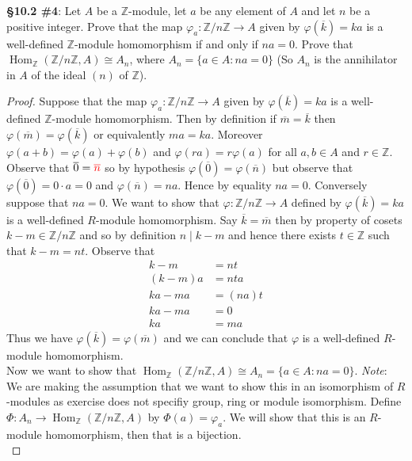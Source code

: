 \documentclass[8pt]{amsart}
\theoremstyle{plain}%
\theoremstyle{definition}
\theoremstyle{remark}
\numberwithin{equation}{section}
\newcommand{\Z}{\mathbb{Z}}
\begin{document}
\textbf{\S 10.2 \#4}: Let $A$ be a $\Z$-module, let $a$ be any element of $A$ and let $n$ be a positive integer. Prove that the map $\varphi_a : \Z/n\Z \to A$ given by $\varphi(\overline k) = ka$ is a well-defined $\mathbb Z$-module homomorphism if and only if $na = 0$. Prove that $\operatorname{Hom}_\Z(\Z/n\Z, A) \cong A_n$, where $A_n = \{a \in A : na = 0\}$ (So $A_n$ is the annihilator in $A$ of the ideal $(n)$ of $\Z$).
	\begin{proof}
		Suppose that the map $\varphi_a : \Z/n\Z \to A$ given by $\varphi(\overline k) = ka$ is a well-defined $\mathbb Z$-module homomorphism. Then by definition if $\overline m = \overline k$ then $\varphi(\overline m) = \varphi(\overline k)$ or equivalently $ma = ka$. Moreover $\varphi(a + b) = \varphi(a) + \varphi(b)$ and $\varphi(ra) = r\varphi(a)$ for all $a, b \in A$ and $r \in \Z$. Observe that $\overline 0 = {\color{red} \overline n}$ so by hypothesis $\varphi(\overline 0) = \varphi(\overline n)$ but observe that $\varphi(\overline 0) = 0 \cdot a = 0$ and $\varphi(\overline n) = na$. Hence by equality $na = 0$. Conversely suppose that $na = 0$. We want to show that $\varphi : \Z/n\Z \to A$ defined by $\varphi(\overline k) = ka$ is a well-defined $R$-module homomorphism. Say $\overline k = \overline m$ then by property of cosets $k - m \in \Z/n\Z$ and so by definition $n \mid k - m$ and hence there exists $t \in \Z$ such that $k - m = nt$. Observe that
		\begin{align*}
			k - m &= nt\\
			(k - m)a &= nta\\
			ka - ma &= (na)t\\
			ka - ma &= 0\\
			ka &= ma 
		\end{align*}
		Thus we have $\varphi(\overline k) = \varphi(\overline m)$ and we can conclude that $\varphi$ is a well-defined $R$-module homomorphism.\\

		Now we want to show that $\operatorname{Hom}_\Z(\Z/n\Z, A) \cong A_n = \{a \in A : na = 0\}$. \textit{Note}: We are making the assumption that we want to show this in an isomorphism of $R$-modules as exercise does not specifiy group, ring or module isomorphism. Define $\Phi : A_n \to \operatorname{Hom}_\Z(\Z/n\Z, A)$ by $\Phi(a) = \varphi_a$. We will show that this is an $R$-module homomorphism, then that is a bijection.\\


\end{proof}
\end{document}
